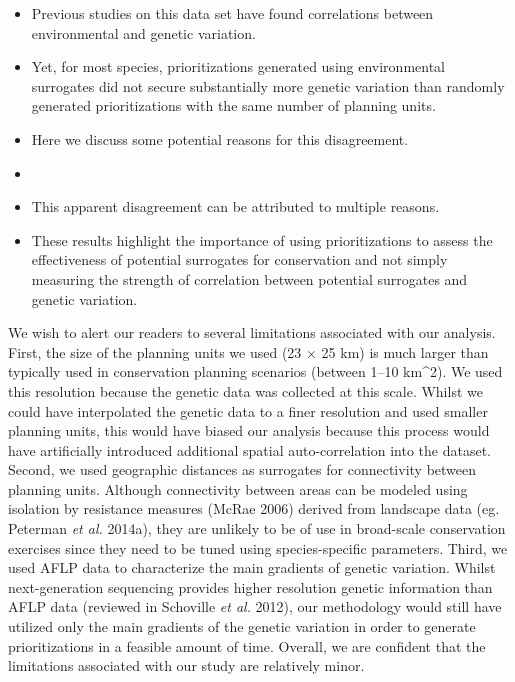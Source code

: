 \documentclass[11pt,]{article}
\begin{document}
\begin{itemize}
\item
  Previous studies on this data set have found correlations between
  environmental and genetic variation.
\item
  Yet, for most species, prioritizations generated using environmental
  surrogates did not secure substantially more genetic variation than
  randomly generated prioritizations with the same number of planning
  units.
\item
  Here we discuss some potential reasons for this disagreement.
\item
\item
  This apparent disagreement can be attributed to multiple reasons.
\item
  These results highlight the importance of using prioritizations to
  assess the effectiveness of potential surrogates for conservation and
  not simply measuring the strength of correlation between potential
  surrogates and genetic variation.
\end{itemize}

We wish to alert our readers to several limitations associated with our
analysis. First, the size of the planning units we used (23 \(\times\)
25 km) is much larger than typically used in conservation planning
scenarios (between 1--10 km\^{}2). We used this resolution because the
genetic data was collected at this scale. Whilst we could have
interpolated the genetic data to a finer resolution and used smaller
planning units, this would have biased our analysis because this process
would have artificially introduced additional spatial auto-correlation
into the dataset. Second, we used geographic distances as surrogates for
connectivity between planning units. Although connectivity between areas
can be modeled using isolation by resistance measures (McRae 2006)
derived from landscape data (eg. Peterman \emph{et al.} 2014a), they are
unlikely to be of use in broad-scale conservation exercises since they
need to be tuned using species-specific parameters. Third, we used AFLP
data to characterize the main gradients of genetic variation. Whilst
next-generation sequencing provides higher resolution genetic
information than AFLP data (reviewed in Schoville \emph{et al.} 2012),
our methodology would still have utilized only the main gradients of the
genetic variation in order to generate prioritizations in a feasible
amount of time. Overall, we are confident that the limitations
associated with our study are relatively minor.
\end{document}
